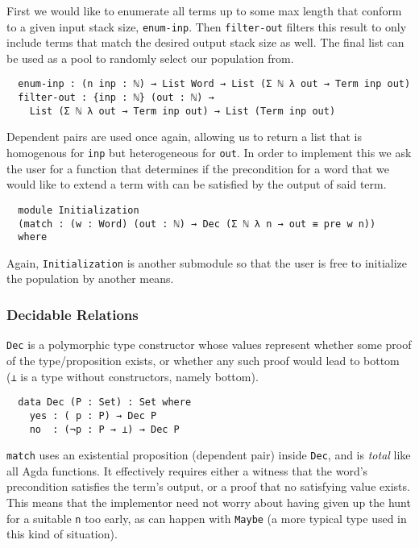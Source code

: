 \documentclass[runningheads,a4paper]{llncs}
\begin{document}
First we would like to enumerate all terms up to some max length that
conform to a given input stack size, \texttt{enum-inp}. Then
\texttt{filter-out} filters this result to only include terms that
match the desired output stack size as well. The final list can be
used as a pool to randomly select our population from.

\begin{verbatim}
  enum-inp : (n inp : ℕ) → List Word → List (Σ ℕ λ out → Term inp out)
  filter-out : {inp : ℕ} (out : ℕ) →
    List (Σ ℕ λ out → Term inp out) → List (Term inp out)
\end{verbatim}

Dependent pairs are used once again, allowing us to return a list
that is homogenous for \texttt{inp} but heterogeneous for
\texttt{out}. In order to implement this we ask the user for a
function that determines if the precondition for a word that we would
like to extend a term with can be satisfied by the output of said
term.

\begin{verbatim}
  module Initialization
  (match : (w : Word) (out : ℕ) → Dec (Σ ℕ λ n → out ≡ pre w n))
  where
\end{verbatim}

Again, \texttt{Initialization} is another submodule so that the user
is free to initialize the population by another means.

\subsubsection{Decidable Relations}

\texttt{Dec} is a polymorphic type constructor whose values
represent whether some proof of the type/proposition exists, or
whether any such proof would lead to bottom (\texttt{⊥} is a type
without constructors, namely bottom).

\begin{verbatim}
  data Dec (P : Set) : Set where
    yes : ( p : P) → Dec P
    no  : (¬p : P → ⊥) → Dec P
\end{verbatim}

\texttt{match} uses an existential proposition (dependent
pair) inside \texttt{Dec}, and is \textit{total} like all Agda functions.
It effectively requires either a witness that the word's precondition
satisfies the term's output, or a proof that no satisfying value
exists. This means that the implementor need not worry about having
given up the hunt for a suitable \texttt{n} too early, as can happen
with \texttt{Maybe} (a more typical type used in this kind of situation).
\end{document}

